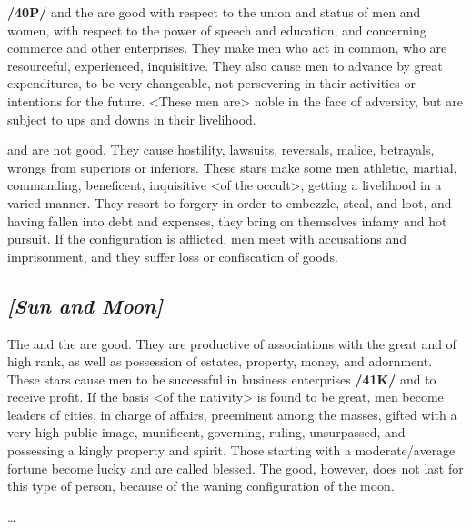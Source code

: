 \textbf{/40P/}\Mercury\xspace and the \Moon\xspace are good with respect to the union and status of men and women, with respect to the power of speech and education, and concerning commerce and other enterprises. They make men who act in common, who are resourceful, experienced, inquisitive. They also cause men to advance by great expenditures, to be very changeable, not persevering in their activities or intentions for the future.
<These men are> noble in the face of adversity, but are subject to ups and downs in their livelihood.

\Mercury\xspace and \Mars\xspace are not good. They cause hostility, lawsuits, reversals, malice, betrayals, wrongs
from superiors or inferiors. These stars make some men athletic, martial, commanding, beneficent, inquisitive <of the occult>, getting a livelihood in a varied manner. They resort to forgery in order to embezzle, steal, and loot, and having fallen into debt and expenses, they bring on themselves infamy and hot pursuit. If the configuration is afflicted, men meet with accusations and imprisonment, and they suffer
loss or confiscation of goods.

\secbr
{}
\subsection{\textit{[Sun and Moon]}}
The \Sun\xspace and the \Moon\xspace are good. They are productive of associations with the great and of high rank,
as well as possession of estates, property, money, and adornment. These stars cause men to be successful in business enterprises \textbf{/41K/} and to receive profit. If the basis <of the nativity> is found to be great, men become leaders of cities, in charge of affairs, preeminent among the masses, gifted with a very high public image, munificent, governing, ruling, unsurpassed, and possessing a kingly property and spirit. Those starting with a moderate/average fortune become lucky and are called blessed. The good, however, does not last for this type of person, because of the waning configuration of the moon. 

\ldots


\newpage